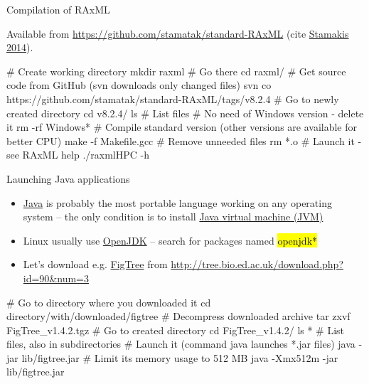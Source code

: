 \documentclass[compress, ucs, xelatex, 11pt, xcolor=svgnames,
  hyperref={
    bookmarks=true,
    unicode=true,
    colorlinks=true,
    pdftitle={Linux, command line and MetaCentrum},
    plainpages=false,
    pdfauthor={Vojtech Zeisek},
    pdfsubject={Course about use of Linux command line, writing shell scripts and using MetaCentrum of CESNET},
    pdfcreator={XeLaTeX},
    pdfkeywords={Linux, GNU, BASH, shell, command line, MetaCentrum},
    linkcolor=Red,
    anchorcolor=Blue,
    citecolor=Purple,
    filecolor=DodgerBlue,
    menucolor=DarkOrchid,
    urlcolor=DeepSkyBlue,
    pdftex},
  url={hyphens, lowtilde} %
  ]{beamer}
\renewcommand{\texttt}[1]{\hl{\ttfamily #1}}
\begin{document}
\begin{frame}[fragile]{Compilation of RAxML}
\begin{footnotesize}
  Available from \url{https://github.com/stamatak/standard-RAxML} (cite \href{https://bioinformatics.oxfordjournals.org/content/30/9/1312.abstract}{Stamakis 2014}).
\end{footnotesize}
  \begin{bashcode}
    # Create working directory
    mkdir raxml
    # Go there
    cd raxml/
    # Get source code from GitHub (svn downloads only changed files)
    svn co https://github.com/stamatak/standard-RAxML/tags/v8.2.4
    # Go to newly created directory
    cd v8.2.4/
    ls # List files
    # No need of Windows version - delete it
    rm -rf Windows*
    # Compile standard version (other versions are available for better CPU)
    make -f Makefile.gcc
    # Remove unneeded files
    rm *.o
    # Launch it - see RAxML help
    ./raxmlHPC -h
  \end{bashcode}
\end{frame}

\begin{frame}[fragile]{Launching Java applications}
\begin{itemize}
  \item \href{https://www.java.com/}{Java} is probably the most portable language working on any operating system -- the only condition is to install \href{https://en.wikipedia.org/wiki/Java_virtual_machine}{Java virtual machine (JVM)}
  \item Linux usually use \href{http://openjdk.java.net/}{OpenJDK} -- search for packages named \texttt{*openjdk*}
  \item Let's download e.g. \href{http://tree.bio.ed.ac.uk/software/figtree/}{FigTree} from \url{http://tree.bio.ed.ac.uk/download.php?id=90&num=3}
\end{itemize}
  \begin{bashcode}
    # Go to directory where you downloaded it
    cd directory/with/downloaded/figtree
    # Decompress downloaded archive
    tar zxvf FigTree_v1.4.2.tgz
    # Go to created directory
    cd FigTree_v1.4.2/
    ls * # List files, also in subdirectories
    # Launch it (command java launches *.jar files)
    java -jar lib/figtree.jar
    # Limit its memory usage to 512 MB
    java -Xmx512m -jar lib/figtree.jar
  \end{bashcode}
\end{frame}

\end{document}
